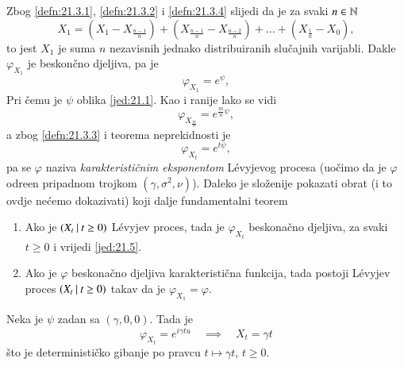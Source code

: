 Zbog \ref{defn:21.3.1}, \ref{defn:21.3.2} i \ref{defn:21.3.4} slijedi da je za svaki $n \in \mathbb{N}$
\begin{equation*}
    X_1 = (X_1 - X_{\frac{n - 1}{n}}) + (X_\frac{n - 1}{n} - X_\frac{n - 2}{n}) + \ldots + (X_\frac{1}{n} - X_0),
\end{equation*}
to jest $X_1$ je suma $n$ nezavisnih jednako distribuiranih slu\v cajnih varijabli.
Dakle $\varphi_{X_1}$ je beskon\v cno djeljiva, pa je
\begin{equation}    \label{jed:21.4}
    \varphi_{X_1} = e^\psi,
\end{equation}
Pri \v cemu je $\psi$ oblika \eqref{jed:21.1}.
Kao i ranije lako se vidi
\begin{equation}
    \varphi_{X_\frac{m}{n}} = e^{\frac{m}{n} \psi},
\end{equation}
a zbog \ref{defn:21.3.3} i teorema neprekidnosti je
\begin{equation}    \label{jed:21.5}
    \varphi_{X_t} = e^{t \psi},
\end{equation}
pa se $\varphi$ naziva \emph{karakteristi\v cnim eksponentom} L\' evyjevog procesa (uo\v cimo da je $\varphi$ odre\dj en pripadnom trojkom $(\gamma, \sigma^2, \nu)$).
Daleko je slo\v zenije pokazati obrat (i to ovdje ne\' cemo dokazivati) koji dalje fundamentalni teorem

\begin{tm}  \label{tm:21.6}
    \begin{enumerate}[label=(\alph*)]
        \item   \label{tm:21.6.1}
        Ako je $({X_t} \: | \: {t \geq 0})$ L\' evyjev proces, tada je $\varphi_{X_t}$ beskona\v cno djeljiva, za svaki $t \geq 0$ i vrijedi \eqref{jed:21.5}.
        \item   \label{tm:21.6.2}
        Ako je $\varphi$ beskona\v cno djeljiva karakteristi\v cna funkcija, tada postoji L\' evyjev proces $({X_t} \: | \: {t \geq 0})$ takav da je $\varphi_{X_1} = \varphi$.
    \end{enumerate}
\end{tm}

\begin{pr}  \label{pr:21.7}
    Neka je $\psi$ zadan sa $(\gamma, 0, 0)$.
    Tada je
    \begin{equation*}
        \varphi_{X_t} = e^{i \gamma t u} \quad \implies \quad X_t = \gamma t
    \end{equation*} 
    \v sto je deterministi\v cko gibanje po pravcu $t \mapsto \gamma t$, $t \geq 0$.
\end{pr}
